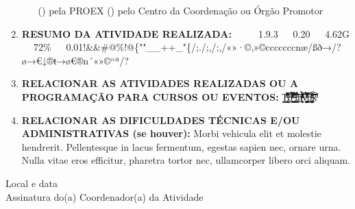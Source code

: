 \documentclass[12pt,a4paper,oneside]{article}%
\begin{document}
\begin{enumerate}
\begin{enumerate}
(\phantom{$\times$}) pela PROEX \hfill (\phantom{$\times$}) pelo Centro da Coordenação ou Órgão Promotor%
\end{enumerate}%
\item%
\textbf{RESUMO DA ATIVIDADE REALIZADA: }%
\newline%
  ✓  1.9.3    0.20    4.62G    72\%    0.01!\&\&\#@\%!@\{""\_\_++\_"\{/;./;,/;,/«»·©,»©cccccccnæ/ßð→/?ø→€↓®ŧ→ø€®n´«»©“ª/?%
\item%
\textbf{RELACIONAR AS ATIVIDADES REALIZADAS OU A PROGRAMAÇÃO PARA CURSOS OU EVENTOS: }%
\newline%
T̡̼͔̣̳̱̮͕̱͉͇̯͐̎͌͆ͫ̆͒͆ͮ̈̕ŏ̶̠̝̲̜͈̣̹̘̻̣̲̼́ͣ̃ͤ̈́͐ͣ͑ͮ͌ͤͨ̎̊̿́̀͟͞ ̵̵̨̘̲͇̜̗̹̠̖͂ͪͨ̈́̿͡͞į̡͕̩̮̬̫̑̈́̌ͤ͋̎́n̴̸̶̻̲̘̠͓͔ͧͥ̔̏ͬ̋̔̇̉̓͊̄̓ͤ͑̏ͭ̚͠v̨̩̭̬̳̗̯̻̙̣̪͔̗̠̱̦͌ͤ̍ͭͧ̏̽̿̂̈̽̅̀͋ͤ̿̀͟ô̶̬͓̭̦͎͙̲̲̗̹̺̖͙͍̻͚̊̊ͨ́̊ͪͭ̓̏̄̏̊̈́̾̈́̄͠͝͡k̒̅̀ͩ̓%
\item%
\textbf{RELACIONAR AS DIFICULDADES TÉCNICAS E/OU ADMINISTRATIVAS (se houver): }%
\newline%
Morbi vehicula elit et molestie hendrerit. Pellentesque in lacus fermentum, egestas sapien nec, ornare urna. Nulla vitae eros efficitur, pharetra tortor nec, ullamcorper libero orci aliquam.%
\end{enumerate}%
\raggedleft%
\bigskip%
\begin{minipage}{.5\textwidth}%
\begin{center}%
\hrulefill%
\newline%
\bigskip%
Local e data \\%
\hrulefill%
\newline%
\bigskip%
Assinatura do(a) Coordenador(a) da Atividade%
\end{center}%
\end{minipage}%
\end{document}
